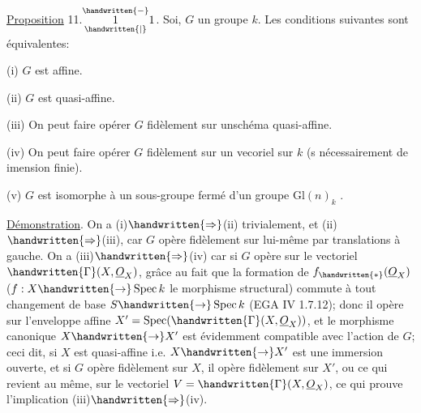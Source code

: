 \uline{Proposition} 11.$\overset{\handwritten{-}}{\underset{\handwritten{\vert}}{1}}1$. Soi, $G$ un groupe  $k$. Les conditions suivantes sont équivalentes:

(i) $G$ est affine.

(ii) $G$ est quasi-affine.

(iii) On peut faire opérer $G$ fidèlement sur unschéma quasi-affine.

(iv) On peut faire opérer $G$ fidèlement sur un vecoriel sur $k$ (s nécessairement de imension finie).

(v)  $G$ est isomorphe à un sous-groupe fermé d'un groupe $\mathrm{Gl}(n)_k$ .

\uline{Démonstration}. On a (i)$\handwritten{\Rightarrow}$(ii) trivialement, et (ii)$\handwritten{\Rightarrow}$(iii), car $G$ opère fidèlement sur lui-même par translations à gauche. On a (iii)$\handwritten{\Rightarrow}$(iv) car si $G$ opère  sur le vectoriel $\handwritten{\Gamma}(X,\underline{O}_X)$, grâce au fait que la formation de $f_{\handwritten{*}}(\underline{O}_X)$ ($f:X\handwritten{\to}\operatorname{Spec}k$ le morphisme structural) commute à tout changement de base $S\handwritten{\to}\operatorname{Spec}k$ (EGA IV 1.7.12); donc il opère sur l'enveloppe affine $X'=\operatorname{Spec}(\handwritten{\Gamma}(X,\underline{O}_X))$, et le morphisme canonique $X\handwritten{\to}X'$ est évidemment compatible avec l'action de $G$; ceci dit, si $X$ est quasi-affine i.e. $X\handwritten{\to}X'$ est une immersion ouverte, et si $G$ opère fidèlement sur $X$, il opère fidèlement sur $X'$, ou ce qui revient au même, sur le vectoriel $V=\handwritten{\Gamma}(X,\underline{O}_X)$, ce qui prouve l'implication (iii)$\handwritten{\Rightarrow}$(iv).

